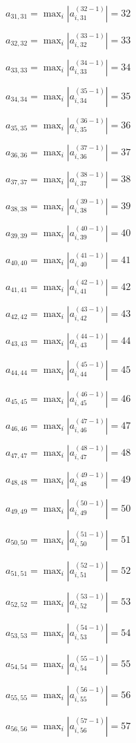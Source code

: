 \documentclass[a4paper,12pt]{article}
\begin{document}
$a _{ 31, 31 } =  \max _i |a _{ i, 31 } ^{ (32 - 1) } | = 32$

$a _{ 32, 32 } =  \max _i |a _{ i, 32 } ^{ (33 - 1) } | = 33$

$a _{ 33, 33 } =  \max _i |a _{ i, 33 } ^{ (34 - 1) } | = 34$

$a _{ 34, 34 } =  \max _i |a _{ i, 34 } ^{ (35 - 1) } | = 35$

$a _{ 35, 35 } =  \max _i |a _{ i, 35 } ^{ (36 - 1) } | = 36$

$a _{ 36, 36 } =  \max _i |a _{ i, 36 } ^{ (37 - 1) } | = 37$

$a _{ 37, 37 } =  \max _i |a _{ i, 37 } ^{ (38 - 1) } | = 38$

$a _{ 38, 38 } =  \max _i |a _{ i, 38 } ^{ (39 - 1) } | = 39$

$a _{ 39, 39 } =  \max _i |a _{ i, 39 } ^{ (40 - 1) } | = 40$

$a _{ 40, 40 } =  \max _i |a _{ i, 40 } ^{ (41 - 1) } | = 41$

$a _{ 41, 41 } =  \max _i |a _{ i, 41 } ^{ (42 - 1) } | = 42$

$a _{ 42, 42 } =  \max _i |a _{ i, 42 } ^{ (43 - 1) } | = 43$

$a _{ 43, 43 } =  \max _i |a _{ i, 43 } ^{ (44 - 1) } | = 44$

$a _{ 44, 44 } =  \max _i |a _{ i, 44 } ^{ (45 - 1) } | = 45$

$a _{ 45, 45 } =  \max _i |a _{ i, 45 } ^{ (46 - 1) } | = 46$

$a _{ 46, 46 } =  \max _i |a _{ i, 46 } ^{ (47 - 1) } | = 47$

$a _{ 47, 47 } =  \max _i |a _{ i, 47 } ^{ (48 - 1) } | = 48$

$a _{ 48, 48 } =  \max _i |a _{ i, 48 } ^{ (49 - 1) } | = 49$

$a _{ 49, 49 } =  \max _i |a _{ i, 49 } ^{ (50 - 1) } | = 50$

$a _{ 50, 50 } =  \max _i |a _{ i, 50 } ^{ (51 - 1) } | = 51$

$a _{ 51, 51 } =  \max _i |a _{ i, 51 } ^{ (52 - 1) } | = 52$

$a _{ 52, 52 } =  \max _i |a _{ i, 52 } ^{ (53 - 1) } | = 53$

$a _{ 53, 53 } =  \max _i |a _{ i, 53 } ^{ (54 - 1) } | = 54$

$a _{ 54, 54 } =  \max _i |a _{ i, 54 } ^{ (55 - 1) } | = 55$

$a _{ 55, 55 } =  \max _i |a _{ i, 55 } ^{ (56 - 1) } | = 56$

$a _{ 56, 56 } =  \max _i |a _{ i, 56 } ^{ (57 - 1) } | = 57$
\end{document}
